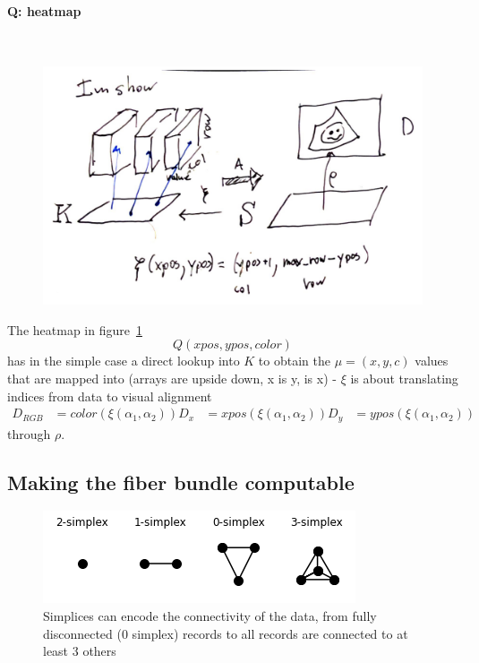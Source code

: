 \documentclass[../main.tex]{subfiles}
\begin{document}
\paragraph{Q: heatmap}\mbox{} \\
\label{sec:artist_example_heatmap}
\begin{figure}[H]
    \includegraphics[width=\textwidth]{figures/math/heatmap.png}
    \label{fig:artist_heatmap}
\end{figure}
The heatmap in figure~\ref{fig:artist_heatmap} 
\begin{equation}
Q(xpos, ypos, color)
\end{equation}
has in the simple case a direct lookup into $K$ to obtain the $\mu = (x,y,c)$ values that are mapped into 
(arrays are upside down, x is y, is x) - $\xi$ is about translating indices from data to visual alignment
\begin{align}
D_{RGB} &= color(\xi(\alpha_1, \alpha_2))
D_x & = xpos(\xi(\alpha_1, \alpha_2))
D_y &= ypos(\xi(\alpha_1, \alpha_2))
\end{align}
through $\rho$. 


\subsection{Making the fiber bundle computable}
\label{sec:triangulization}

\begin{figure}[H]
    \includegraphics{figures/math/simplex.png}
    \caption{Simplices can encode the connectivity of the data, from fully disconnected (0 simplex) records to all records are connected to at least 3 others}
    \label{fig:triangle_simplex}
\end{figure}
\end{document}

